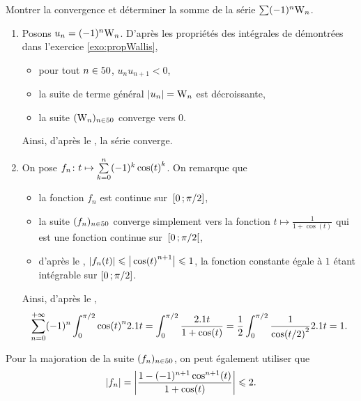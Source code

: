 
\begin{exercice}
Montrer la convergence et déterminer la somme de la série $\sum (-1)^n \Wallis_n$.
\end{exercice}

\begin{solution}
\begin{enumerate}
\item Posons $u_n = (-1)^n \Wallis_n$. D'après les propriétés des intégrales de  démontrées dans l'exercice \ref{exo:propWallis},
\begin{itemize}
\item pour tout $n \in \N$, $u_n u_{n+1} < 0$,
\item la suite de terme général $\abs{u_n} = \Wallis_n$ est décroissante,
\item la suite $(\Wallis_n)_{n \in \N}$ converge vers $0$.
\end{itemize}
Ainsi, d'après le , la série converge.

\item On pose $\fonctionligne[f_n]{t}{\sum\limits_{k=0}^n (-1)^k \cos(t)^k}$. On remarque que
\begin{itemize}
\item la fonction $f_n$ est continue sur~$\interff{0}{\pi/2}$,
\item la suite $(f_n)_{n \in \N}$ converge simplement vers la fonction $t \mapsto \frac{1}{1 + \cos(t)}$ qui est une fonction continue sur~$\interfo{0}{\pi/2}$,
\item d'après le , $\abs{f_n(t)} \leqslant \big|\cos(t)^{n+1}\big| \leqslant 1$, la fonction constante égale à $1$ étant intégrable sur $\interff{0}{\pi/2}$.
\end{itemize}
Ainsi, d'après le ,
\[
\sum_{n=0}^{+\infty} (-1)^n \int_0^{\pi/2} \cos(t)^n \d t
= \int_0^{\pi/2} \frac{\d t}{1 + \cos(t)}
= \frac{1}{2} \int_0^{\pi/2} \frac{1}{\cos(t/2)^2} \d t
= 1.
\]
\end{enumerate}
\end{solution}

\begin{remarque}
Pour la majoration de la suite $(f_n)_{n \in \N}$, on peut également utiliser que
\[
\abs{f_n}
= \module{\frac{1 - (-1)^{n+1} \cos^{n+1}(t)}{1 + \cos(t)}}
\leqslant 2.
\]

\end{remarque}

